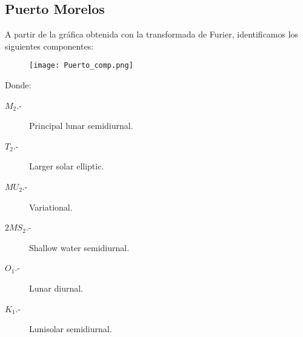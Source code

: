 \documentclass{article}
\begin{document}
\subsection{Puerto Morelos}
A partir de la gráfica obtenida con la transformada de Furier, identificamos los siguientes componentes:\\
\begin{figure}[h]
\texttt{[image: Puerto\_comp.png]}
\end{figure}
Donde:
\begin{description}
\item[$M_2$.-] Principal lunar semidiurnal.
\item[$T_2$.-] Larger solar elliptic.
\item[$MU_2$.-] Variational.
\item[$2MS_2$.-] Shallow water semidiurnal.
\item[$O_1$.-] Lunar diurnal.
\item[$K_1$.-] Lunisolar semidiurnal.
\end{description}
\end{document}
